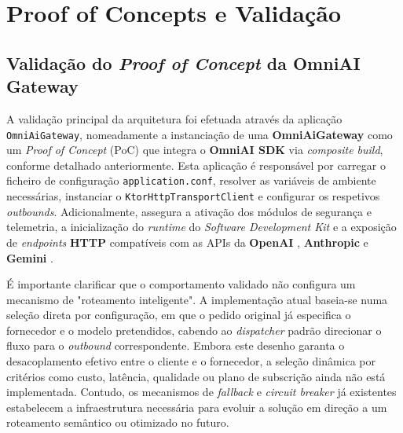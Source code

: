     \chapter{Proof of Concepts e Validação}

    \section{Validação do \textit{Proof of Concept} da \textbf{OmniAI Gateway}}
    A validação principal da arquitetura foi efetuada através da aplicação \texttt{OmniAiGateway}, nomeadamente a instanciação de uma \textbf{OmniAiGateway} como um \textit{Proof of Concept} (PoC) que integra o \textbf{OmniAI SDK} via \textit{composite build}, conforme detalhado anteriormente. Esta aplicação é responsável por carregar o ficheiro de configuração \texttt{application.conf}, resolver as variáveis de ambiente necessárias, instanciar o \texttt{KtorHttpTransportClient} e configurar os respetivos \textit{outbounds}. Adicionalmente, assegura a ativação dos módulos de segurança e telemetria, a inicialização do \textit{runtime} do \textit{Software Development Kit} e a exposição de \textit{endpoints} \textbf{HTTP} compatíveis com as APIs da \textbf{OpenAI} \cite{openai_api}, \textbf{Anthropic} \cite{anthropic_api} e \textbf{Gemini} \cite{google_gemini_api}.
    
    É importante clarificar que o comportamento validado não configura um mecanismo de "roteamento inteligente". A implementação atual baseia-se numa seleção direta por configuração, em que o pedido original já especifica o fornecedor e o modelo pretendidos, cabendo ao \textit{dispatcher} padrão direcionar o fluxo para o \textit{outbound} correspondente. Embora este desenho garanta o desacoplamento efetivo entre o cliente e o fornecedor, a seleção dinâmica por critérios como custo, latência, qualidade ou plano de subscrição ainda não está implementada. Contudo, os mecanismos de \textit{fallback} e \textit{circuit breaker} \cite{treinaweb_circuit_breaker} \cite{itau_circuit_breaker} \cite{microsoft_circuit_breaker} já existentes estabelecem a infraestrutura necessária para evoluir a solução em direção a um roteamento semântico ou otimizado no futuro.

